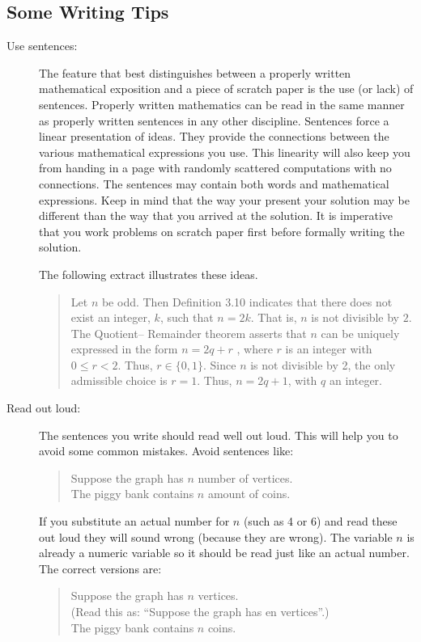 \subsection{Some Writing Tips}
\begin{description}
    \item[Use sentences:] The feature that best distinguishes between a properly
        written mathematical exposition and a piece of scratch paper is the use (or
        lack) of sentences. Properly written mathematics can be read in the same manner as
        properly written sentences in any other discipline. Sentences force a linear
        presentation of ideas. They provide the connections between the various
        mathematical expressions you use. This linearity will also keep you from handing
        in a page with randomly scattered computations with no connections. The
        sentences may contain both words and mathematical expressions. Keep in mind that
        the way your present your solution may be different than the way that you arrived
        at the solution.  It is imperative that you work problems on scratch paper first
        before formally writing the solution.  
        
        The following extract illustrates these ideas.

        \begin{quote}
           Let $n$ be odd. Then Definition 3.10 indicates that there does not exist an
           integer, $k$, such that $n = 2k$. That is, $n$ is not divisible by $2$. The
           Quotient– Remainder theorem asserts that $n$ can be uniquely expressed in the
           form $n = 2q + r$ , where $r$ is an integer with $0 \le r < 2$. Thus, $r \in
           \{0, 1\}$. Since $n$ is not divisible by 2, the only admissible choice is $r =
           1$. Thus, $n = 2q + 1$, with $q$ an integer.
        \end{quote}


    \item[Read out loud:] The sentences you write should read well out loud. This will
        help you to avoid some common mistakes. Avoid sentences like:
        \begin{quote}
            Suppose the graph has $n$ number of vertices.\\
            The piggy bank contains $n$ amount of coins.
        \end{quote}
        If you substitute an actual number for $n$ (such as 4 or 6) and read these out loud
        they will sound wrong (because they are wrong). The variable $n$ is already a
        numeric variable so it should be read just like an actual number. The correct
        versions are:
        \begin{quote}
            Suppose the graph has $n$ vertices.\\
            (Read this as: ``Suppose the graph has en vertices''.) \\
            The piggy bank contains $n$ coins.
        \end{quote}


\end{description}
